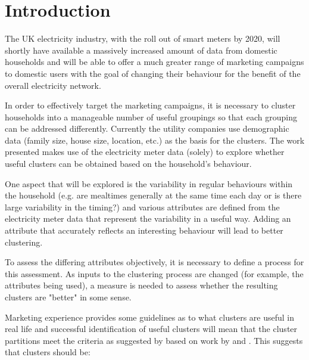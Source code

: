 \documentclass[conference]{IEEEtran}
\begin{document}
\IEEEpeerreviewmaketitle


\section{Introduction}




The UK electricity industry, with the roll out of smart meters by 2020, will shortly have available a massively increased amount of data from domestic households and will be able to offer a much greater range of marketing campaigns to domestic users with the goal of changing their behaviour for the benefit of the overall electricity network.

In order to effectively target the marketing campaigns, it is necessary to cluster households into a manageable number of useful groupings so that each grouping can be addressed differently. Currently the utility companies use demographic data (family size, house size, location, etc.) as the basis for the clusters. The work presented makes use of the electricity meter data (solely) to explore whether useful clusters can be obtained based on the household's behaviour.

One aspect that will be explored is the variability in regular behaviours within the household (e.g. are mealtimes generally at the same time each day or is there large variability in the timing?) and various attributes are defined from the electricity meter data that represent the variability in a useful way. Adding an attribute that accurately reflects an interesting behaviour will lead to better clustering.

To assess the differing attributes objectively, it is necessary to define a process for this assessment. As inputs to the clustering process are changed (for example, the attributes being used), a measure is needed to assess whether the resulting clusters are "better" in some sense.

Marketing experience provides some guidelines as to what clusters are useful in real life and successful identification of useful clusters will mean that the cluster partitions meet the criteria as suggested by \cite{sarstedt2011concise} based on work by \cite{dibb1999criteria} \cite{tonks2009validity} and \cite{Kotler2008}. This suggests that clusters should be:
\end{document}
